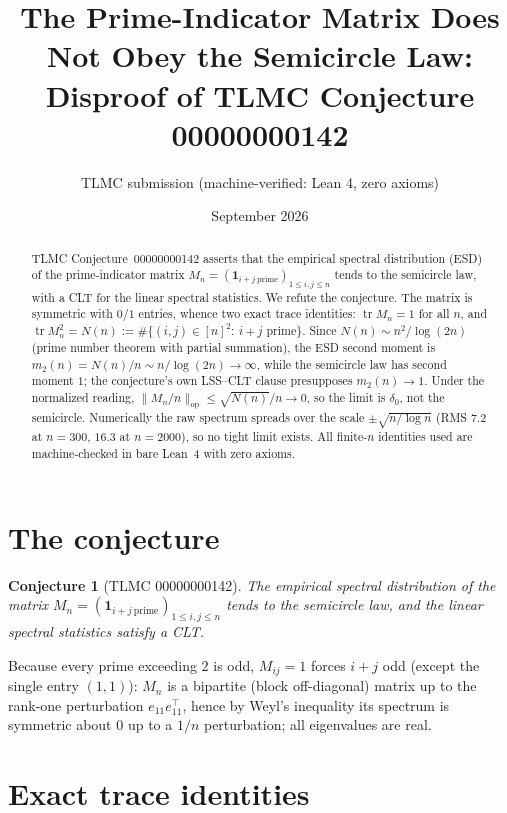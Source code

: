 \documentclass[11pt]{article}
\title{The Prime-Indicator Matrix Does Not Obey the Semicircle Law:\\
Disproof of TLMC Conjecture 00000000142}
\author{TLMC submission (machine-verified: Lean 4, zero axioms)}
\date{September 2026}
\newtheorem{conjecture}{Conjecture}
\begin{document}
\maketitle

\begin{abstract}
TLMC Conjecture~00000000142 asserts that the empirical spectral distribution (ESD) of
the prime-indicator matrix $M_n=(\mathbf 1_{i+j\ \mathrm{prime}})_{1\le i,j\le n}$
tends to the semicircle law, with a CLT for the linear spectral statistics.
We refute the conjecture. The matrix is symmetric with $0/1$ entries, whence two exact
trace identities: $\operatorname{tr}M_n=1$ for all $n$, and
$\operatorname{tr}M_n^2=N(n):=\#\{(i,j)\in[n]^2:\ i+j \text{ prime}\}$.
Since $N(n)\sim n^2/\log(2n)$ (prime number theorem with partial summation), the ESD
second moment is $m_2(n)=N(n)/n\sim n/\log(2n)\to\infty$, while the semicircle law has
second moment $1$; the conjecture's own LSS--CLT clause presupposes $m_2(n)\to 1$.
Under the normalized reading, $\|M_n/n\|_{\mathrm{op}}\le\sqrt{N(n)}/n\to0$, so the
limit is $\delta_0$, not the semicircle. Numerically the raw spectrum spreads over the
scale $\pm\sqrt{n/\log n}$ (RMS $7.2$ at $n=300$, $16.3$ at $n=2000$), so no tight
limit exists. All finite-$n$ identities used are machine-checked in bare Lean~4 with
zero axioms.
\end{abstract}

\section{The conjecture}

\begin{conjecture}[TLMC 00000000142]
The empirical spectral distribution of the matrix
$M_n=(\mathbf 1_{i+j\ \mathrm{prime}})_{1\le i,j\le n}$ tends to the semicircle law,
and the linear spectral statistics satisfy a CLT.
\end{conjecture}

Because every prime exceeding $2$ is odd, $M_{ij}=1$ forces $i+j$ odd (except the
single entry $(1,1)$): $M_n$ is a bipartite (block off-diagonal) matrix up to the rank-one
perturbation $e_{11}e_{11}^{\!\top}$, hence by Weyl's inequality its spectrum is
symmetric about $0$ up to a $1/n$ perturbation; all eigenvalues are real.

\section{Exact trace identities}
\end{document}
